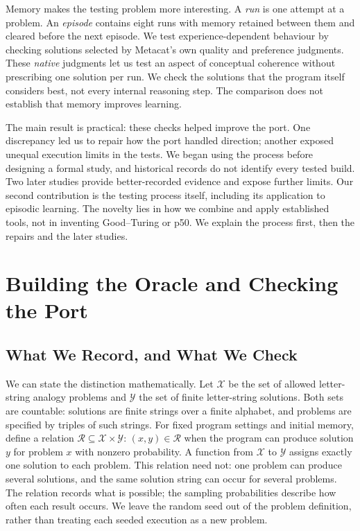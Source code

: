 \documentclass[10pt,letterpaper]{article}
\begin{document}
Memory makes the testing problem more interesting. A \emph{run} is one attempt at a
problem. An \emph{episode} contains eight runs with memory retained between them and
cleared before the next episode. We test experience-dependent behaviour by checking
solutions selected by Metacat's own quality and preference judgments. These \emph{native}
judgments let us test an aspect of conceptual coherence without prescribing one solution
per run. We check the solutions that the program itself considers best, not every internal
reasoning step. The comparison does not establish that memory improves learning.

The main result is practical: these checks helped improve the port. One discrepancy led us
to repair how the port handled direction; another exposed unequal execution limits in the
tests. We began using the process before designing a formal study, and historical records
do not identify every tested build. Two later studies provide better-recorded evidence and
expose further limits. Our second contribution is the testing process itself, including
its application to episodic learning. The novelty lies in how we combine and apply
established tools, not in inventing Good--Turing or p50. We explain the process first,
then the repairs and the later studies.

\section{Building the Oracle and Checking the Port}\label{sec:method}

\subsection{What We Record, and What We Check}\label{sec:outcomes}

We can state the distinction mathematically. Let \(\mathcal X\) be the set of allowed
letter-string analogy problems and \(\mathcal Y\) the set of finite letter-string
solutions. Both sets are countable: solutions are finite strings over a finite alphabet,
and problems are specified by triples of such strings. For fixed program settings and
initial memory, define a relation \(\mathcal R\subseteq\mathcal X\times\mathcal Y\):
\((x,y)\in\mathcal R\) when the program can produce solution \(y\) for problem \(x\) with
nonzero probability. A function from \(\mathcal X\) to \(\mathcal Y\) assigns exactly one
solution to each problem. This relation need not: one problem can produce several
solutions, and the same solution string can occur for several problems. The relation
records what is possible; the sampling probabilities describe how often each result
occurs. We leave the random seed out of the problem definition, rather than treating each
seeded execution as a new problem.
\end{document}
